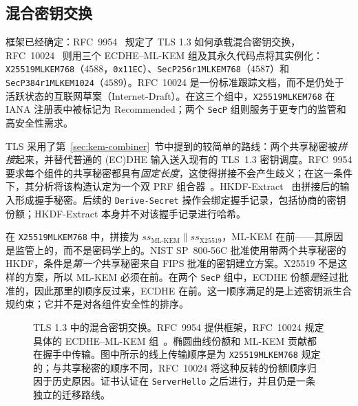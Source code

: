 \subsection{混合密钥交换}
\label{sec:tls-hybrid}
框架已经确定：RFC~9954~\cite{rfc9954} 规定了 TLS 1.3 如何承载混合密钥交换，RFC~10024~\cite{rfc10024} 则用三个 ECDHE--ML-KEM 组及其永久代码点将其实例化：\texttt{X25519MLKEM768}（$4588$，\texttt{0x11EC}）、\texttt{SecP256r1MLKEM768}（$4587$）和 \texttt{SecP384r1MLKEM1024}（$4589$）。RFC~10024 是一份标准跟踪文档，而不是仍处于活跃状态的互联网草案（Internet-Draft）。在这三个组中，\texttt{X25519MLKEM768} 在 IANA 注册表中被标记为 Recommended；两个 \texttt{SecP} 组则服务于更专门的监管和高安全性需求。

TLS 采用了第~\ref{sec:kem-combiner}~节中提到的较简单的路线：两个共享秘密被\emph{拼接}起来，并替代普通的 (EC)DHE 输入送入现有的 TLS~1.3 密钥调度。RFC~9954 要求每个组件的共享秘密都具有\emph{固定长度}，这使得拼接不会产生歧义；在这一条件下，其分析将该构造认定为一个双 PRF 组合器~\cite{rfc9954}。HKDF-Extract~\cite{rfc5869} 由拼接后的输入形成握手秘密。后续的 \texttt{Derive-Secret} 操作会绑定握手记录，包括协商的密钥份额；HKDF-Extract 本身并不对该握手记录进行哈希。

\begin{remark}[为什么共享秘密的拼接顺序不同]
在 \texttt{X25519MLKEM768} 中，拼接为 $ss_{\text{ML-KEM}} \|
ss_{\text{X25519}}$，ML-KEM 在前——其原因是监管上的，而不是密码学上的。NIST SP~800-56C 批准使用带两个共享秘密的 HKDF，条件是\emph{第一个}共享秘密来自 FIPS 批准的密钥建立方案。X25519 不是这样的方案，所以 ML-KEM 必须在前。在两个 \texttt{SecP} 组中，ECDHE 份额\emph{是}经过批准的，因此那里的顺序反过来，ECDHE 在前。这一顺序满足的是上述密钥派生合规约束；它并不是对各组件安全性的排序。
\end{remark}

\begin{figure}[H]
\centering
{}
\caption{TLS 1.3 中的混合密钥交换。RFC~9954 提供框架，RFC~10024 规定具体的 ECDHE--ML-KEM 组~\cite{rfc9954,rfc10024}。椭圆曲线份额和 ML-KEM 贡献都在握手中传输。图中所示的线上传输顺序是为 \texttt{X25519MLKEM768} 规定的；与共享秘密的顺序不同，RFC~10024 将这种反转的份额顺序归因于历史原因。证书认证在 \texttt{ServerHello} 之后进行，并且仍是一条独立的迁移路线。}
\label{fig:tls-hybrid}
\end{figure}

